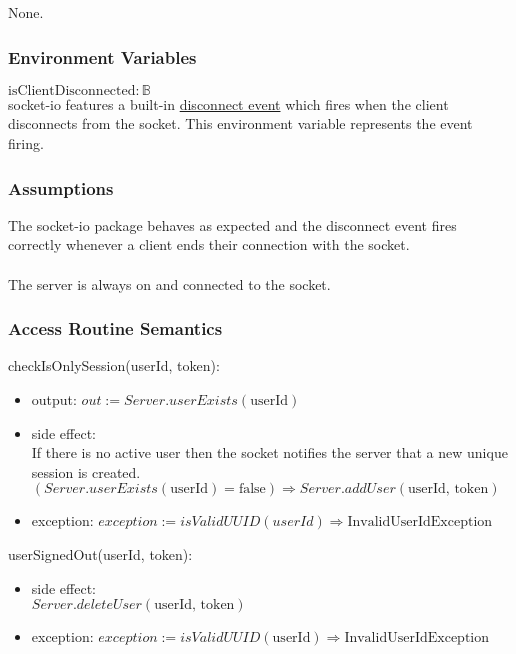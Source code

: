 \documentclass[12pt, titlepage]{article}
\begin{document}
None.

\subsubsection{Environment Variables}

$\text{isClientDisconnected}: \mathbb{B}$ \\
socket-io features a built-in \href{https://socket.io/docs/v4/client-socket-instance/#disconnect}{disconnect event} which fires when the client disconnects from the socket. This environment variable represents the event firing.  

\subsubsection{Assumptions}

The socket-io package behaves as expected and the disconnect event fires correctly whenever a client ends their connection with the socket. \\ \\
The server is always on and connected to the socket.

\subsubsection{Access Routine Semantics}

\noindent checkIsOnlySession(userId, token):
\begin{itemize}
\item output: $out := Server.userExists(\text{userId})$
\item side effect: \\
If there is no active user then the socket notifies the server that a new unique session is created. \\
$(Server.userExists(\text{userId}) = \text{false}) \Rightarrow Server.addUser(\text{userId, token})$ 

\item exception: $exception := isValidUUID(userId) \Rightarrow \text{InvalidUserIdException}$ 
\end{itemize}

\noindent userSignedOut(userId, token):
\begin{itemize}
\item side effect: \\
$Server.deleteUser(\text{userId, token})$ 

\item exception: $exception := isValidUUID(\text{userId}) \Rightarrow \text{InvalidUserIdException}$ 
\end{itemize}
\end{document}
